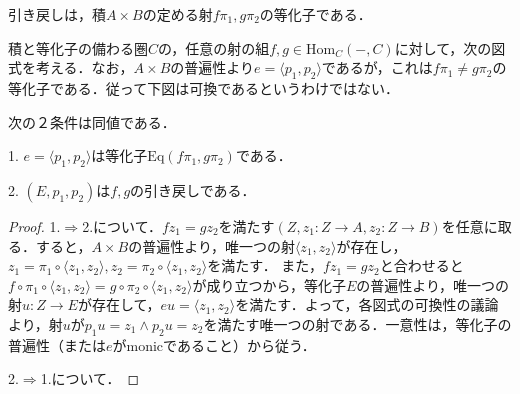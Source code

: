 \documentclass[uplatex, dvipdfmx]{jsarticle}
\begin{document}
引き戻しは，積$A\times B$の定める射$f\pi_1,g\pi_2$の等化子である．
\begin{proposition}[引き戻しの等化子としての特徴付け]
    積と等化子の備わる圏$C$の，任意の射の組$f,g\in\mathrm{Hom}_C(-,C)$に対して，次の図式を考える．なお，$A\times B$の普遍性より$e=\langle p_1,p_2\rangle$であるが，これは$f\pi_1\ne g\pi_2$の等化子である．従って下図は可換であるというわけではない．
    \begin{center}
    \end{center}
    次の２条件は同値である．

    1. $e=\langle p_1,p_2\rangle$は等化子$\mathrm{Eq}(f\pi_1,g\pi_2)$である．

    2. $(E,p_1,p_2)$は$f,g$の引き戻しである．
\end{proposition}
\begin{proof}
    1.$\Rightarrow$2.について．$fz_1=gz_2$を満たす$(Z,z_1:Z\to A,z_2:Z\to B)$を任意に取る．すると，$A\times B$の普遍性より，唯一つの射$\langle z_1,z_2\rangle$が存在し，$z_1=\pi_1\circ\langle z_1,z_2\rangle,z_2=\pi_2\circ\langle z_1,z_2\rangle$を満たす．
    また，$fz_1=gz_2$と合わせると$f\circ\pi_1\circ\langle z_1,z_2\rangle=g\circ\pi_2\circ\langle z_1,z_2\rangle$が成り立つから，等化子$E$の普遍性より，唯一つの射$u:Z\to E$が存在して，$eu=\langle z_1,z_2\rangle$を満たす．よって，各図式の可換性の議論より，射$u$が$p_1u=z_1\land p_2u=z_2$を満たす唯一つの射である．一意性は，等化子の普遍性（または$e$がmonicであること）から従う．
    \begin{center}
    \end{center}

    2.$\Rightarrow$1.について．
\end{proof}
\end{document}
